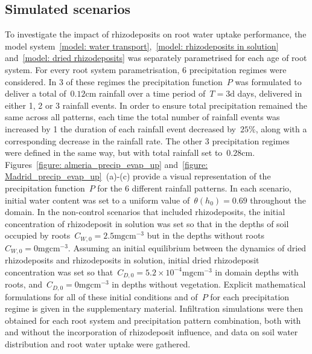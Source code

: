\documentclass[11pt,a4paper]{article}
\numberwithin{equation}{section}
\begin{document}
\subsection{Simulated scenarios}
To investigate the impact of rhizodeposits on root water uptake performance, the model system~\eqref{model: water transport},~\eqref{model: rhizodeposits in solution} and~\eqref{model: dried rhizodeposits} was separately parametrised for each age of root system. For every root system parametrisation, 6 precipitation regimes were considered. In 3 of these regimes the precipitation function~$P$ was formulated to deliver a total of~$0.12\text{cm}$ rainfall over a time period of~$T=3\text{d}$ days, delivered in either 1, 2 or 3 rainfall events. In order to ensure total precipitation remained the same across all patterns, each time the total number of rainfall events was increased by 1 the duration of each rainfall event decreased by~$25\%$, along with a corresponding decrease in the rainfall rate. The other 3 precipitation regimes were defined in the same way, but with total rainfall set to~$0.28\text{cm}$. Figures~\ref{figure: almeria_precip_evap_up} and~\ref{figure: Madrid_precip_evap_up}~(a)-(c) provide a visual representation of the precipitation function~$P$ for the 6 different rainfall patterns. In each scenario, initial water content was set to a uniform value of~$\theta(h_0) = 0.69$ throughout the domain. In the non-control scenarios that included rhizodeposits, the initial concentration of rhizodeposit in solution was set so that in the depths of soil occupied by roots~$C_{W,0}=2.5\text{mgcm}^{-3}$ but in the depths without roots~$C_{W,0}=0\text{mgcm}^{-3}$. Assuming an initial equilibrium between the dynamics of dried rhizodeposits and rhizodeposits in solution, initial dried rhizodeposit concentration was set so that~$C_{D,0}=5.2\times10^{-4}\text{mgcm}^{-3}$ in domain depths with roots, and~$C_{D,0}=0\text{mgcm}^{-3}$ in depths without vegetation. Explicit mathematical formulations for all of these initial conditions and of~$P$ for each precipitation regime is given in the supplementary material. Infiltration simulations were then obtained for each root system and precipitation pattern combination, both with and without the incorporation of rhizodeposit influence, and data on soil water distribution and root water uptake were gathered.    
\end{document}
